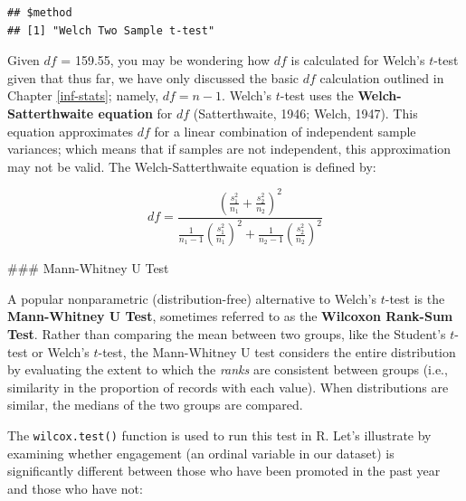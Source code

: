 \documentclass[]{book}
\newenvironment{Shaded}{\begin{snugshade}}{\end{snugshade}}
\newcommand{\CommentTok}[1]{\textcolor[rgb]{0.56,0.35,0.01}{\textit{#1}}}
\newcommand{\DataTypeTok}[1]{\textcolor[rgb]{0.13,0.29,0.53}{#1}}
\newcommand{\DecValTok}[1]{\textcolor[rgb]{0.00,0.00,0.81}{#1}}
\newcommand{\KeywordTok}[1]{\textcolor[rgb]{0.13,0.29,0.53}{\textbf{#1}}}
\newcommand{\NormalTok}[1]{#1}
\newcommand{\OperatorTok}[1]{\textcolor[rgb]{0.81,0.36,0.00}{\textbf{#1}}}
\newcommand{\StringTok}[1]{\textcolor[rgb]{0.31,0.60,0.02}{#1}}
\begin{document}
\begin{verbatim}
## $method
## [1] "Welch Two Sample t-test"
\end{verbatim}

Given \(df\) = 159.55, you may be wondering how \(df\) is calculated for Welch's \(t\)-test given that thus far, we have only discussed the basic \(df\) calculation outlined in Chapter \ref{inf-stats}; namely, \(df = n - 1\). Welch's \(t\)-test uses the \textbf{Welch-Satterthwaite equation} for \(df\) (Satterthwaite, 1946; Welch, 1947). This equation approximates \(df\) for a linear combination of independent sample variances; which means that if samples are not independent, this approximation may not be valid. The Welch-Satterthwaite equation is defined by:

\[ df = \frac {(\frac{s^2_1}{n_1} + \frac{s^2_2}{n_2})^2} {\frac{1}{n_1 - 1} (\frac{s^2_1}{n_1})^2 + \frac{1}{n_2 - 1} (\frac{s^2_2}{n_2})^2} \]

\#\#\# Mann-Whitney U Test

A popular nonparametric (distribution-free) alternative to Welch's \(t\)-test is the \textbf{Mann-Whitney U Test}, sometimes referred to as the \textbf{Wilcoxon Rank-Sum Test}. Rather than comparing the mean between two groups, like the Student's \(t\)-test or Welch's \(t\)-test, the Mann-Whitney U test considers the entire distribution by evaluating the extent to which the \emph{ranks} are consistent between groups (i.e., similarity in the proportion of records with each value). When distributions are similar, the medians of the two groups are compared.

The \texttt{wilcox.test()} function is used to run this test in R. Let's illustrate by examining whether engagement (an ordinal variable in our dataset) is significantly different between those who have been promoted in the past year and those who have not:

\begin{Shaded}
\end{Shaded}
\end{document}
